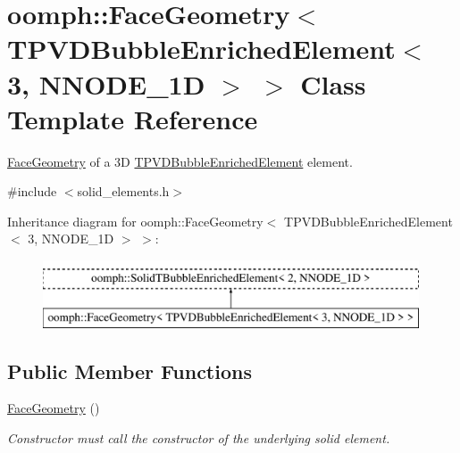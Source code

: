 \hypertarget{classoomph_1_1FaceGeometry_3_01TPVDBubbleEnrichedElement_3_013_00_01NNODE__1D_01_4_01_4}{}\section{oomph\+:\+:Face\+Geometry$<$ T\+P\+V\+D\+Bubble\+Enriched\+Element$<$ 3, N\+N\+O\+D\+E\+\_\+1D $>$ $>$ Class Template Reference}
\label{classoomph_1_1FaceGeometry_3_01TPVDBubbleEnrichedElement_3_013_00_01NNODE__1D_01_4_01_4}


\hyperlink{classoomph_1_1FaceGeometry}{Face\+Geometry} of a 3D \hyperlink{classoomph_1_1TPVDBubbleEnrichedElement}{T\+P\+V\+D\+Bubble\+Enriched\+Element} element.  




{\ttfamily \#include $<$solid\+\_\+elements.\+h$>$}

Inheritance diagram for oomph\+:\+:Face\+Geometry$<$ T\+P\+V\+D\+Bubble\+Enriched\+Element$<$ 3, N\+N\+O\+D\+E\+\_\+1D $>$ $>$\+:\begin{figure}[H]
\begin{center}
\leavevmode
\includegraphics[height=2.000000cm]{classoomph_1_1FaceGeometry_3_01TPVDBubbleEnrichedElement_3_013_00_01NNODE__1D_01_4_01_4}
\end{center}
\end{figure}
\subsection*{Public Member Functions}
\begin{DoxyCompactItemize}
\item 
\hyperlink{classoomph_1_1FaceGeometry_3_01TPVDBubbleEnrichedElement_3_013_00_01NNODE__1D_01_4_01_4_acbeb095ed3639f72d0c5fee3d4971ba1}{Face\+Geometry} ()
\begin{DoxyCompactList}\small\item\em Constructor must call the constructor of the underlying solid element. \end{DoxyCompactList}\end{DoxyCompactItemize}


